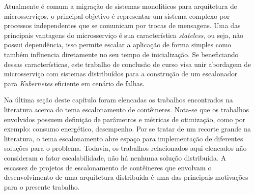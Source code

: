 Atualmente é comum a migração de sistemas monolíticos para arquitetura de microsserviços, o principal objetivo é representar um sistema complexo por processos independentes que se comunicam por trocas de mensagens. Uma das principais vantagens do microsserviço é sua característica \textit{stateless}, ou seja, não possui dependência, isso permite escalar a aplicação de forma simples como também influencia diretamente no seu tempo de inicialização. Se beneficiando dessas características, este trabalho de conclusão de curso visa unir abordagem de microsserviço com sistemas distribuídos para a construção de um escalonador para \textit{Kubernetes} eficiente em cenário de falhas.

Na última seção deste capítulo foram elencadas os trabalhos encontrados na literatura acerca do tema escalonamento de contêineres. Nota-se que os trabalhos envolvidos possuem definição de parâmetros e métricas de otimização, como por exemplo: consumo energético, desempenho. Por se tratar de um recorte grande na literatura, o tema escalonamento abre espaço para implementação de diferentes soluções para o problema. Todavia, os trabalhos relacionados aqui elencados não consideram o fator escalabilidade, não há nenhuma solução distribuída. A escassez de projetos de escalonamento de contêineres que envolvam o desenvolvimento de uma arquitetura distribuída é uma das principais motivações para o presente trabalho.
